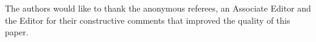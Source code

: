 \documentclass[ejs]{imsart}
\theoremstyle{plain}
\theoremstyle{definition}
\theoremstyle{remark}
\begin{document}
\begin{acks}[Acknowledgments]
The authors would like to thank the anonymous referees, an Associate
Editor and the Editor for their constructive comments that improved the
quality of this paper.
\end{acks}


\begin{supplement}
\end{supplement}
\begin{supplement}
\end{supplement}


\end{document}
